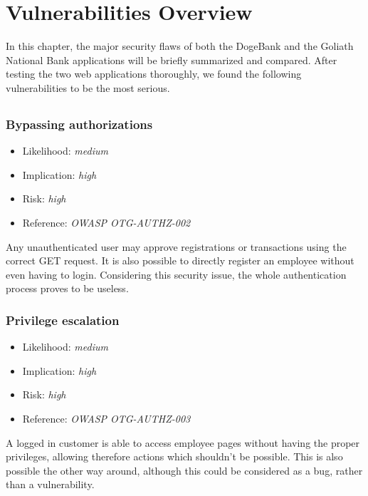 \chapter{Vulnerabilities Overview}\label{chapter:vulnerabilities_overview}
In this chapter, the major security flaws of both the DogeBank and the Goliath National Bank applications will be briefly summarized and compared.\newline
After testing the two web applications thoroughly, we found the following vulnerabilities to be the most serious.
\section{\doge}
\subsection{Bypassing authorizations} \label{over:bypassing}
\begin{itemize}
	\item Likelihood: \textit{medium}
	\item Implication: \textit{high}
	\item Risk: \textit{high}
	\item Reference: \textit{OWASP OTG-AUTHZ-002}
\end{itemize}
Any unauthenticated user may approve registrations or transactions using the correct GET request. It is also possible to directly register an employee without even having to login. Considering this security issue, the whole authentication process proves to be useless.
\subsection{Privilege escalation} \label{over:privilege}
\begin{itemize}
	\item Likelihood: \textit{medium}
	\item Implication: \textit{high}
	\item Risk: \textit{high}
	\item Reference: \textit{OWASP OTG-AUTHZ-003}
\end{itemize}
A logged in customer is able to access employee pages without having the proper privileges, allowing therefore actions which shouldn't be possible. This is also possible the other way around, although this could be considered as a bug, rather than a vulnerability.

